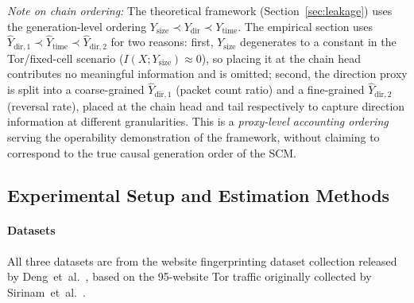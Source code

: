 \documentclass[lettersize,journal]{IEEEtran}
\begin{document}
\textit{Note on chain ordering:} The theoretical framework
(Section~\ref{sec:leakage}) uses the generation-level ordering
$Y_{\mathrm{size}}\prec Y_{\mathrm{dir}}\prec Y_{\mathrm{time}}$.
The empirical section uses
$\hat{Y}_{\mathrm{dir},1}\prec \hat{Y}_{\mathrm{time}}\prec \hat{Y}_{\mathrm{dir},2}$
for two reasons: first, $Y_{\mathrm{size}}$ degenerates to a constant in
the Tor/fixed-cell scenario ($I(X;Y_{\mathrm{size}})\approx 0$), so
placing it at the chain head contributes no meaningful information and is
omitted; second, the direction proxy is split into a coarse-grained
$\hat{Y}_{\mathrm{dir},1}$ (packet count ratio) and a fine-grained
$\hat{Y}_{\mathrm{dir},2}$ (reversal rate), placed at the chain head and
tail respectively to capture direction information at different granularities.
This is a \emph{proxy-level accounting ordering} serving the operability
demonstration of the framework, without claiming to correspond to the true
causal generation order of the SCM.

\subsection{Experimental Setup and Estimation Methods}

\paragraph{Datasets}
All three datasets are from the website fingerprinting dataset collection
released by Deng~et~al.~\cite{deng2024earlystage}, based on the 95-website
Tor traffic originally collected by Sirinam~et~al.~\cite{sirinam2018deep}.
\end{document}
